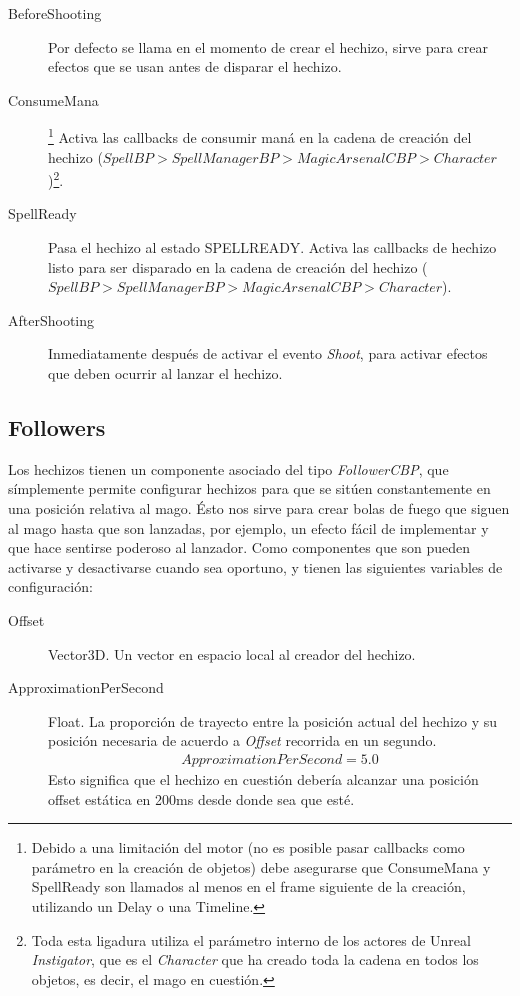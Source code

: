 \documentclass[12pt]{report}
\begin{document}
\begin{description}
	\item[BeforeShooting] Por defecto se llama en el momento de crear el hechizo, sirve para crear efectos que se usan antes de disparar el hechizo.
	\item[ConsumeMana]\footnote{Debido a una limitación del motor (no es posible pasar callbacks como parámetro en la creación de objetos) debe asegurarse que ConsumeMana y SpellReady son llamados al menos en el frame siguiente de la creación, utilizando un Delay o una Timeline.} Activa las callbacks de consumir maná en la cadena de creación del hechizo ($SpellBP > SpellManagerBP > MagicArsenalCBP > Character$)\footnote{Toda esta ligadura utiliza el parámetro interno de los actores de Unreal \textit{Instigator}, que es el \textit{\emph{Character}} que ha creado toda la cadena en todos los objetos, es decir, el mago en cuestión.}.
	\item[SpellReady] Pasa el hechizo al estado SPELL\textunderscore READY. Activa las callbacks de hechizo listo para ser disparado en la cadena de creación del hechizo ($SpellBP > SpellManagerBP > MagicArsenalCBP > Character$).
	\item[AfterShooting] Inmediatamente después de activar el evento \textit{Shoot}, para activar efectos que deben ocurrir al lanzar el hechizo.
\end{description}

\subsection{Followers}

Los hechizos tienen un componente asociado del tipo \textit{\emph{FollowerCBP}}, que símplemente permite configurar hechizos para que se sitúen constantemente en una posición relativa al mago. Ésto nos sirve para crear bolas de fuego que siguen al mago hasta que son lanzadas, por ejemplo, un efecto fácil de implementar y que hace sentirse poderoso al lanzador. Como componentes que son pueden activarse y desactivarse cuando sea oportuno, y tienen las siguientes variables de configuración:

\begin{description}
	\item[Offset] Vector3D. Un vector en espacio local al creador del hechizo.
	\item[ApproximationPerSecond] Float. La proporción de trayecto entre la posición actual del hechizo y su posición necesaria de acuerdo a \textit{Offset} recorrida en un segundo.
	\begin{align}
		ApproximationPerSecond = 5.0
	\end{align}
	Esto significa que el hechizo en cuestión debería alcanzar una posición offset estática en 200ms desde donde sea que esté.
\end{description}
\end{document}
